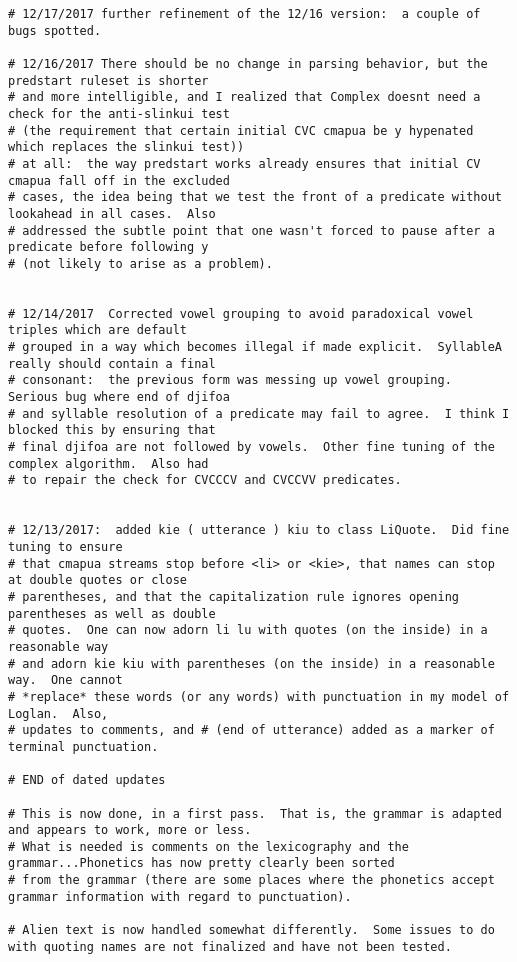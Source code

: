 \documentclass[12pt]{book}
\begin{document}
{\begin{verbatim}
# 12/17/2017 further refinement of the 12/16 version:  a couple of bugs spotted.

# 12/16/2017 There should be no change in parsing behavior, but the predstart ruleset is shorter
# and more intelligible, and I realized that Complex doesnt need a check for the anti-slinkui test
# (the requirement that certain initial CVC cmapua be y hypenated which replaces the slinkui test))
# at all:  the way predstart works already ensures that initial CV cmapua fall off in the excluded
# cases, the idea being that we test the front of a predicate without lookahead in all cases.  Also
# addressed the subtle point that one wasn't forced to pause after a predicate before following y
# (not likely to arise as a problem).


# 12/14/2017  Corrected vowel grouping to avoid paradoxical vowel triples which are default
# grouped in a way which becomes illegal if made explicit.  SyllableA really should contain a final
# consonant:  the previous form was messing up vowel grouping.  Serious bug where end of djifoa
# and syllable resolution of a predicate may fail to agree.  I think I blocked this by ensuring that
# final djifoa are not followed by vowels.  Other fine tuning of the complex algorithm.  Also had
# to repair the check for CVCCCV and CVCCVV predicates.


# 12/13/2017:  added kie ( utterance ) kiu to class LiQuote.  Did fine tuning to ensure
# that cmapua streams stop before <li> or <kie>, that names can stop at double quotes or close
# parentheses, and that the capitalization rule ignores opening parentheses as well as double
# quotes.  One can now adorn li lu with quotes (on the inside) in a reasonable way
# and adorn kie kiu with parentheses (on the inside) in a reasonable way.  One cannot
# *replace* these words (or any words) with punctuation in my model of Loglan.  Also,
# updates to comments, and # (end of utterance) added as a marker of terminal punctuation.

# END of dated updates

# This is now done, in a first pass.  That is, the grammar is adapted and appears to work, more or less.
# What is needed is comments on the lexicography and the grammar...Phonetics has now pretty clearly been sorted
# from the grammar (there are some places where the phonetics accept grammar information with regard to punctuation).

# Alien text is now handled somewhat differently.  Some issues to do with quoting names are not finalized and have not been tested.


\end{verbatim}}
\end{document}
